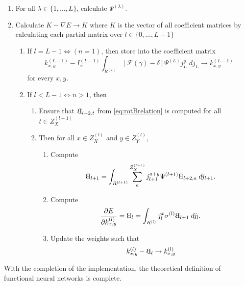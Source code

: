 \documentclass[titlepage, twoside]{article}
\numberwithin{equation}{subsection}
\numberwithin{theorem}{subsection}
\newcommand{\rotB}{\scalebox{-1}[1]{B}}
\begin{document}
\begin{enumerate}
\item For all $\lambda \in \{ 1,\dots, L \}$, calculate $\Psi^{(\lambda)}$.

\item Calculate $K - \nabla E \to K$ where $K$ is the vector of all coefficient matrices by calculating each partial matrix over $l \in \{0,\dots, L-1\}$

  \begin{enumerate}
  \item If $l = L - 1 \Leftrightarrow (n = 1)$, then store into the coefficient matrix
    \begin{equation}
       k_{x,y}^{(L-1)} - I_x^{(L-1)}
        \int_{R^{(L)}} \left[\mathcal{F}(\gamma) - \delta\right] 
          \Psi^{(L)} j_L^y \; dj_L \to  k_{x,y}^{(L-1)}
    \end{equation}
    for every $x,y.$
    

    \item  If $l < L - 1 \Leftrightarrow n > 1$, then
    \begin{enumerate}
      \item Ensure that $\rotB_{l+2,t}$ from \eqref{eq:rotBrelation} is computed for all $t \in Z^{(l+1)}_X$

      \item Then for all $x\in Z^{(l)}_X$ and $y\in Z^{(l)}_Y$,
      \begin{enumerate}

        \item Compute
          \begin{equation}
           \rotB_{l+1} = \int_{R^{(l+1)}} \sum_a^{Z^{(l+1)}_X}
             j^{a+y}_{l+1} \Psi^{(l+1)} \rotB_{l+2, a}\; dj_{l+1}. 
          \end{equation}

        \item Compute 
        \begin{equation}
           \frac{\partial E}{\partial k^{(l)}_{x,y}} = \rotB_{l} = \int_{R^{(l)}}
            j_{l}^x \sigma^{(l)} \rotB_{l+1}\; dj_l.
        \end{equation}
      
        \item Update the weights such that 
        \begin{equation}
          k_{x,y}^{(l)} - \rotB_l \to k_{x,y}^{(l)}
        \end{equation}
      \end{enumerate}
    \end{enumerate}
  \end{enumerate}
\end{enumerate}

With the completion of the implementation, the theoretical definition of functional neural networks is complete.
\end{document}
